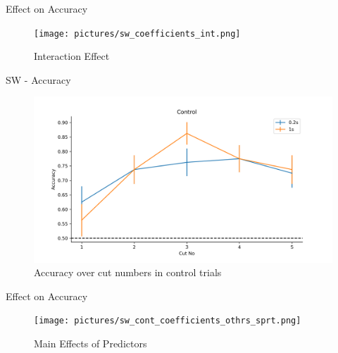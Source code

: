 \documentclass[10pt,xcolor=svgnames]{beamer} %
\begin{document}
\begin{frame}{Effect on Accuracy}
    \begin{figure}
        \hspace*{-1cm} 
        \centering
        \texttt{[image: pictures/sw\_coefficients\_int.png]}
        \caption{Interaction Effect}
        \label{fig:sw_coefficients_int}
    \end{figure}
\end{frame}

\begin{frame}{SW - Accuracy}
    \begin{figure}
        \hspace*{-1cm} 
        \centering
        \includegraphics[width = 1.1\textwidth]{pictures/sw_control.png}
        \caption{Accuracy over cut numbers in control trials}
        \label{fig:sw_cont_acc}
    \end{figure}
\end{frame}

\begin{frame}{Effect on Accuracy}
    \begin{figure}
        \hspace*{-1cm} 
        \centering
        \texttt{[image: pictures/sw\_cont\_coefficients\_othrs\_sprt.png]}
        \caption{Main Effects of Predictors}
        \label{fig:sw_coefficients}
    \end{figure}
\end{frame}
\end{document}
